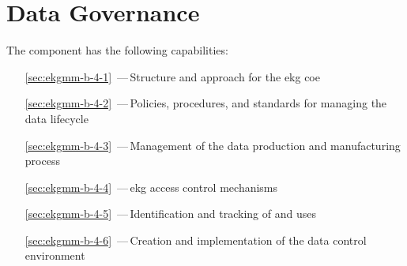 \chapter{Data Governance}\label{ch:ekg-mm-b-4} %

The  component has the following capabilities:

\begin{itemize}[leftmargin=.5in]
  \item [\ref{sec:ekgmm-b-4-1}] \,---\,Structure and approach for the \gls{ekg} \gls{coe}
  \item [\ref{sec:ekgmm-b-4-2}] \,---\,Policies, procedures, and standards for managing the data lifecycle
  \item [\ref{sec:ekgmm-b-4-3}] \,---\,Management of the data production and manufacturing process
  \item [\ref{sec:ekgmm-b-4-4}] \,---\,\gls{ekg} access control mechanisms
  \item [\ref{sec:ekgmm-b-4-5}] \,---\,Identification and tracking of  and uses
  \item [\ref{sec:ekgmm-b-4-6}] \,---\,Creation and implementation of the data control environment
\end{itemize}







